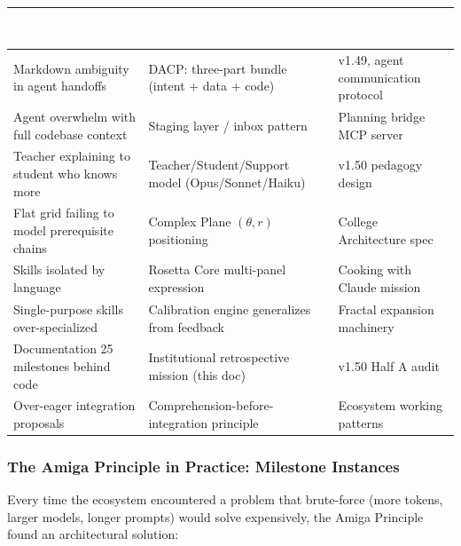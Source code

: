 \documentclass[11pt,letterpaper]{article}
\newcommand{\tableheader}[1]{\textbf{\sffamily\textcolor{white}{#1}}}
\begin{document}
\begin{center}
\begin{tabularx}{\textwidth}{L{3.5cm}L{4cm}X}
\toprule
{}
\tableheader{Friction Point} & \tableheader{Pattern Derived} & \tableheader{Where It Lives Now} \\
\midrule
Markdown ambiguity in agent handoffs & DACP: three-part bundle (intent + data + code) & v1.49, agent communication protocol \\
Agent overwhelm with full codebase context & Staging layer / inbox pattern & Planning bridge MCP server \\
Teacher explaining to student who knows more & Teacher/Student/Support model (Opus/Sonnet/Haiku) & v1.50 pedagogy design \\
Flat grid failing to model prerequisite chains & Complex Plane $(θ, r)$ positioning & College Architecture spec \\
Skills isolated by language & Rosetta Core multi-panel expression & Cooking with Claude mission \\
Single-purpose skills over-specialized & Calibration engine generalizes from feedback & Fractal expansion machinery \\
Documentation 25 milestones behind code & Institutional retrospective mission (this doc) & v1.50 Half A audit \\
Over-eager integration proposals & Comprehension-before-integration principle & Ecosystem working patterns \\
\bottomrule
\end{tabularx}
\end{center}

\subsubsection{The Amiga Principle in Practice: Milestone Instances}

Every time the ecosystem encountered a problem that brute-force (more tokens, larger models,
longer prompts) would solve expensively, the Amiga Principle found an architectural solution:
\end{document}
